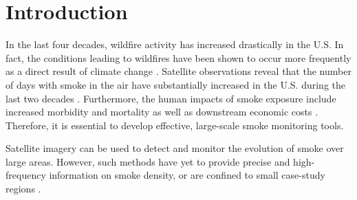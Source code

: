 \documentclass{article}
\begin{document}
\section{Introduction}
In the last four decades, wildfire activity has increased drastically in the U.S. In fact, the conditions leading to wildfires have been shown to occur more frequently as a direct result of climate change \citep{wildfire-risk}.  Satellite observations reveal that the number of days with smoke in the air have substantially increased in the U.S. during the last two decades \citep{wildfire-risk}. Furthermore, the human impacts of smoke exposure include increased morbidity and mortality as well as downstream economic costs \citep{health-impacts}. Therefore, it is essential to develop effective, large-scale smoke monitoring tools. 

Satellite imagery can be used to detect and monitor the evolution of smoke over large areas.
However, such methods have yet to provide precise and high-frequency information on smoke density, or are confined to small case-study regions \citep{Wen2021WildfireSP, canada-smoke-height, autralia-smoke-ml}. 
\end{document}

